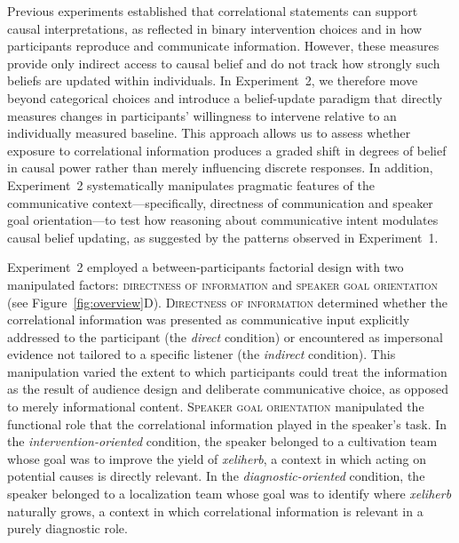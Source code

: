 \documentclass[10pt,letterpaper]{article}
\begin{document}
Previous experiments established that correlational statements can support causal interpretations, as reflected in binary intervention choices and in how participants reproduce and communicate information. However, these measures provide only indirect access to causal belief and do not track how strongly such beliefs are updated within individuals. In Experiment~2, we therefore move beyond categorical choices and 
introduce a belief-update paradigm that directly measures changes in participants’ willingness to intervene relative to an individually measured baseline. 
This approach allows us to assess whether exposure to correlational information produces a graded shift in degrees of belief in causal power rather than merely influencing discrete responses. In addition, Experiment~2 systematically manipulates pragmatic features of the communicative context—specifically, directness of communication and speaker goal orientation—to test how reasoning about communicative intent modulates causal belief updating, as suggested by the patterns observed in Experiment~1.

Experiment~2 employed a between-participants factorial design with two manipulated factors: \textsc{directness of information} and \textsc{speaker goal orientation} (see Figure~\ref{fig:overview}D).
%
\textsc{Directness of information} determined whether the correlational information was presented as communicative input explicitly addressed to the participant (the \emph{direct} condition) or encountered as impersonal evidence not tailored to a specific listener (the \emph{indirect} condition). This manipulation varied the extent to which participants could treat the information as the result of audience design and deliberate communicative choice, as opposed to merely informational content.
%
\textsc{Speaker goal orientation} manipulated the functional role that the correlational information played in the speaker’s task. In the \emph{intervention-oriented} condition, the speaker belonged to a cultivation team whose goal was to improve the yield of \textit{xeliherb}, a context in which acting on potential causes is directly relevant. In the \emph{diagnostic-oriented} condition, the speaker belonged to a localization team whose goal was to identify where \textit{xeliherb} naturally grows, a context in which correlational information is relevant in a purely diagnostic role.
\end{document}
